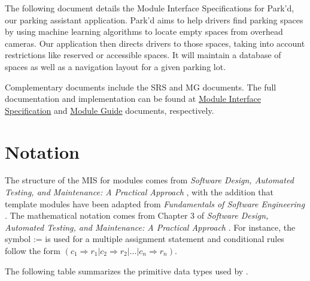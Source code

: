 \documentclass[12pt, titlepage]{article}
\begin{document}
The following document details the Module Interface Specifications for Park'd,
our parking assistant application. Park'd aims to help drivers find parking
spaces by using machine learning algorithms to locate empty spaces from overhead
cameras. Our application then directs drivers to those spaces, taking into
account restrictions like reserved or accessible spaces. It will maintain a
database of spaces as well as a navigation layout for a given parking lot.

Complementary documents include the SRS and MG documents. The full documentation
and implementation can be found at
\href{https://github.com/parkd-app/park-d/tree/main/docs/Design/MIS/MIS.pdf}{Module
Interface Specification} and
\href{https://github.com/parkd-app/park-d/tree/main/docs/Design/MG/MG.pdf}{Module
Guide} documents, respectively.

\section{Notation}

The structure of the MIS for modules comes from \emph{Software Design, Automated
Testing, and Maintenance: A Practical Approach} \cite{HoffmanAndStrooper1995},
with the addition that template modules have been adapted from
\emph{Fundamentals of Software Engineering} \cite{GhezziEtAl2003}.  The
mathematical notation comes from Chapter 3 of \emph{Software Design, Automated
Testing, and Maintenance: A Practical Approach} \cite{HoffmanAndStrooper1995}.
For instance, the symbol := is used for a multiple assignment statement and
conditional rules follow the form $(c_1 \Rightarrow r_1 | c_2 \Rightarrow r_2 |
... | c_n \Rightarrow r_n )$.

\newpage
The following table summarizes the primitive data types used by \progname. 
\end{document}
